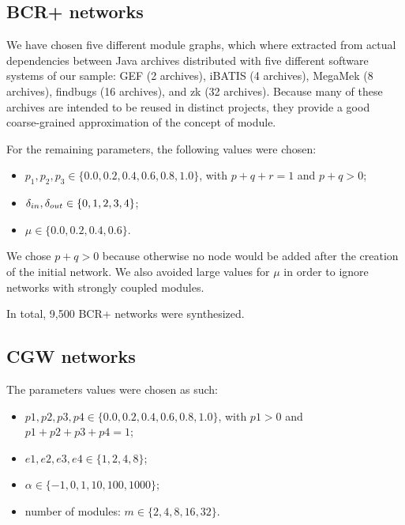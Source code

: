 \subsection{BCR+ networks}

We have chosen five different module graphs, which where extracted from actual
dependencies between Java archives distributed with five different software
systems of our sample: GEF (2 archives), iBATIS (4 archives), MegaMek (8
archives), findbugs (16 archives), and zk (32 archives). Because many of these
archives are intended to be reused in distinct projects, they provide a good
coarse-grained approximation of the concept of module.


For the remaining parameters, the following values were chosen:

\begin{itemize}
\item $p_1, p_2, p_3 \in \{0.0, 0.2, 0.4, 0.6, 0.8, 1.0\}$, with $p + q + r = 1$ and
$p + q > 0$;
\item $\delta_{in}, \delta_{out} \in \{0, 1, 2, 3, 4\}$;
\item $\mu \in \{0.0, 0.2, 0.4, 0.6\}$.
\end{itemize}

We chose $p + q > 0$ because otherwise no node would be added after the
creation of the initial network. We also avoided large values for $\mu$ in
order to ignore networks with strongly coupled modules. 

In total, 9,500 BCR+ networks were synthesized.

\subsection{CGW networks}

The parameters values were chosen as such:

\begin{itemize}
\item $p1, p2, p3, p4 \in \{0.0, 0.2, 0.4, 0.6, 0.8, 1.0\}$, with $p1 > 0$ and
$p1 + p2 + p3 + p4 = 1$;
\item $e1, e2, e3, e4 \in \{1, 2, 4, 8\}$;
\item $\alpha \in \{-1, 0, 1, 10, 100, 1000\}$;
\item number of modules: $m \in \{2, 4, 8, 16, 32\}$.
\end{itemize}


